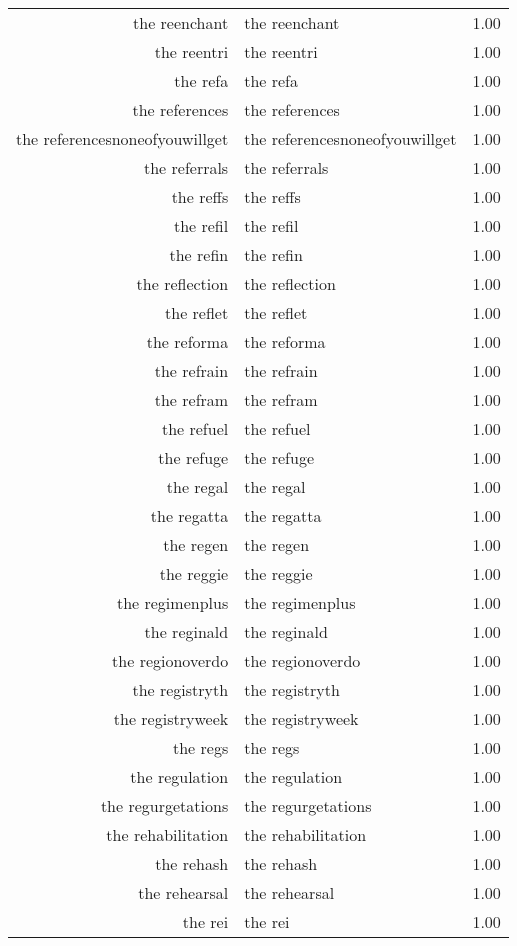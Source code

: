 \begin{table}[ht]
\begin{tabular}{rlr}
  the reenchant & the reenchant & 1.00 \\ 
  the reentri & the reentri & 1.00 \\ 
  the refa & the refa & 1.00 \\ 
  the references & the references & 1.00 \\ 
  the referencesnoneofyouwillget & the referencesnoneofyouwillget & 1.00 \\ 
  the referrals & the referrals & 1.00 \\ 
  the reffs & the reffs & 1.00 \\ 
  the refil & the refil & 1.00 \\ 
  the refin & the refin & 1.00 \\ 
  the reflection & the reflection & 1.00 \\ 
  the reflet & the reflet & 1.00 \\ 
  the reforma & the reforma & 1.00 \\ 
  the refrain & the refrain & 1.00 \\ 
  the refram & the refram & 1.00 \\ 
  the refuel & the refuel & 1.00 \\ 
  the refuge & the refuge & 1.00 \\ 
  the regal & the regal & 1.00 \\ 
  the regatta & the regatta & 1.00 \\ 
  the regen & the regen & 1.00 \\ 
  the reggie & the reggie & 1.00 \\ 
  the regimenplus & the regimenplus & 1.00 \\ 
  the reginald & the reginald & 1.00 \\ 
  the regionoverdo & the regionoverdo & 1.00 \\ 
  the registryth & the registryth & 1.00 \\ 
  the registryweek & the registryweek & 1.00 \\ 
  the regs & the regs & 1.00 \\ 
  the regulation & the regulation & 1.00 \\ 
  the regurgetations & the regurgetations & 1.00 \\ 
  the rehabilitation & the rehabilitation & 1.00 \\ 
  the rehash & the rehash & 1.00 \\ 
  the rehearsal & the rehearsal & 1.00 \\ 
  the rei & the rei & 1.00 \\ 

\end{tabular}
\end{table}
